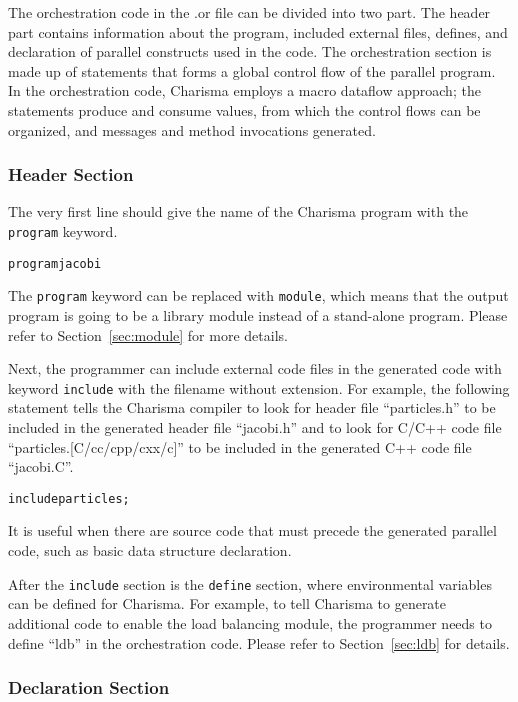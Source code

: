 
The orchestration code in the .or file can be divided into two part. The header
part contains information about the program, included external files, defines,
and declaration of parallel constructs used in the code. The orchestration
section is made up of statements that forms a global control flow of the
parallel program. In the orchestration code, Charisma employs a macro dataflow
approach; the statements produce and consume values, from which the control flows
can be organized, and messages and method invocations generated. 

\subsubsection{Header Section}

The very first line should give the name of the Charisma program with the {\tt
program} keyword.

\begin{alltt}
    program jacobi 
\end{alltt}

The {\tt program} keyword can be replaced with {\tt module}, which means that
the output program is going to be a library module instead of a stand-alone
program. Please refer to Section~\ref{sec:module} for more details.

Next, the programmer can include external code files in the generated code with
keyword {\tt include} with the filename without extension. For example, the
following statement tells the Charisma compiler to look for header file
``particles.h'' to be included in the generated header file ``jacobi.h'' and to
look for C/C++ code file ``particles.[C/cc/cpp/cxx/c]'' to be included in the
generated C++ code file ``jacobi.C''.

\begin{alltt}
    include particles;
\end{alltt}

It is useful when there are source code that must precede the generated
parallel code, such as basic data structure declaration. 

After the {\tt include} section is the {\tt define} section, where environmental
variables can be defined for Charisma. For example, to tell Charisma to generate
additional code to enable the load balancing module, the programmer needs to 
define ``ldb'' in the orchestration code. Please refer to Section~\ref{sec:ldb}
for details.

\subsubsection{Declaration Section}

